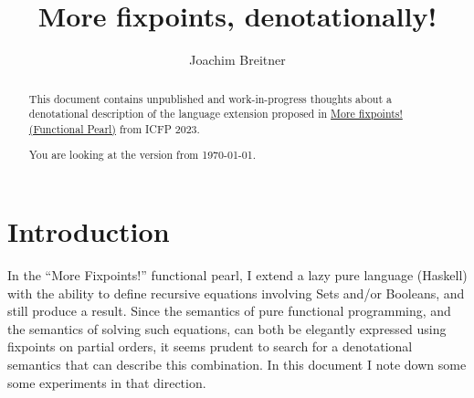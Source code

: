 \documentclass[manuscript,screen,acmsmall,nonacm]{acmart}
\begin{document}
\title{More fixpoints, denotationally!}

\author{Joachim Breitner}


\begin{abstract}
This document contains unpublished and work-in-progress thoughts about a denotational description of the language extension proposed in
\href{https://joachim-breitner.de/publications/rec-def-pearl.pdf}{More fixpoints! (Functional Pearl)} from ICFP 2023.

\medskip\noindent
You are looking at the version from \today.
\end{abstract}

\maketitle

\section{Introduction}

In the “More Fixpoints!” functional pearl, I extend a lazy pure language (Haskell) with the ability to define recursive equations involving Sets and/or Booleans, and still produce a result. Since the semantics of pure functional programming, and the semantics of solving such equations, can both be elegantly expressed using fixpoints on partial orders, it seems prudent to search for a denotational semantics that can describe this combination. In this document I note down some some experiments in that direction.
\end{document}
